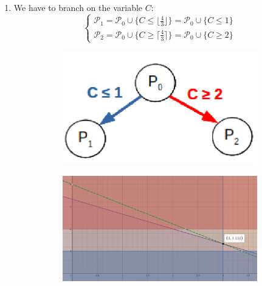 \begin{example}
\begin{enumerate}
        \item We have to branch on the variable $C$:
            \[  
                \begin{cases}
                    \mathcal{P}_1 = \mathcal{P}_0 \cup \{ C \leq \lfloor \frac{4}{3} \rfloor \} = \mathcal{P}_0 \cup \{ C \leq 1 \} \\
                    \mathcal{P}_2 = \mathcal{P}_0 \cup \{ C \geq \lceil \frac{4}{3} \rceil \} = \mathcal{P}_0 \cup \{ C \geq 2 \}
                \end{cases}    
            \]
            \begin{figure}[H]
                \centering
                \begin{subfigure}{0.2\linewidth}
                    \centering
                    \includegraphics[width=\linewidth]{./img/bakery_tree2.png}
                \end{subfigure}
                \begin{subfigure}{0.55\linewidth}
                    \centering
                    \includegraphics[width=\linewidth]{./img/bakery_2.png}
                \end{subfigure}
            \end{figure}
        

\end{enumerate}
\end{example}
